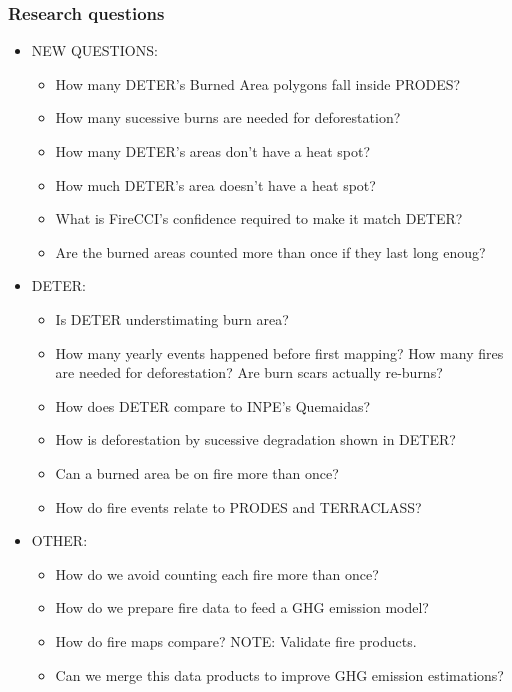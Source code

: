 \documentclass{beamer}
\begin{document}
\begin{frame}[t, allowframebreaks]
    \frametitle{Research questions}
    \begin{itemize}
        \item NEW QUESTIONS:
        \begin{itemize}
            \item How many DETER's Burned Area polygons fall inside PRODES?
            \item How many sucessive burns are needed for deforestation?
            \item How many DETER's areas don't have a heat spot?
            \item How much DETER's area doesn't have a heat spot?
            \item What is FireCCI's confidence required to make it match DETER?
            \item Are the burned areas counted more than once if they last long
                enoug?
        \end{itemize}
        \item DETER:
        \begin{itemize}
            \item Is DETER understimating burn area?
            \item How many yearly events happened before first mapping? How 
                many fires are needed for deforestation? Are burn scars 
                actually re-burns?
            \item How does DETER compare to INPE's Quemaidas?
            \item How is deforestation by sucessive degradation shown in DETER?
            \item Can a burned area be on fire more than once?
            \item How do fire events relate to PRODES and TERRACLASS?
        \end{itemize}
        \item OTHER:
        \begin{itemize}
            \item How do we avoid counting each fire more than once? 
            \item How do we prepare fire data to feed a GHG emission model?
            \item How do fire maps compare? NOTE: Validate fire products. 
            \item Can we merge this data products to improve GHG emission 
                estimations?

\end{itemize}
\end{itemize}
\end{frame}
\end{document}
